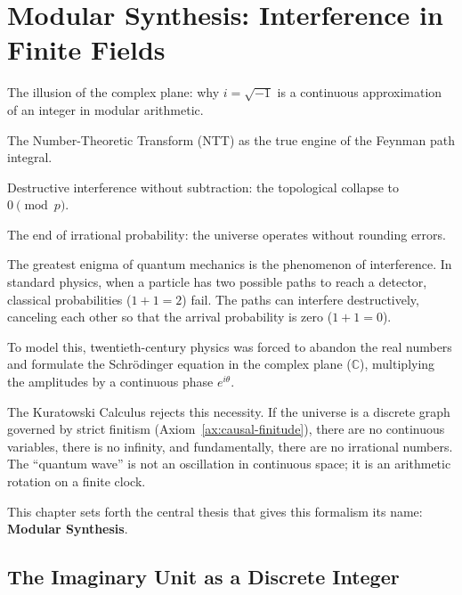 \chapter{Modular Synthesis: Interference in Finite Fields}
\label{ch:modulo-synthesis}

\begin{introduction}
  \item The illusion of the complex plane: why $i = \sqrt{-1}$ is a
        continuous approximation of an integer in modular arithmetic.
  \item The Number-Theoretic Transform (NTT) as the true engine of the
        Feynman path integral.
  \item Destructive interference without subtraction: the topological collapse to $0 \pmod p$.
  \item The end of irrational probability: the universe operates without rounding errors.
\end{introduction}

The greatest enigma of quantum mechanics is the phenomenon of
interference. In standard physics, when a particle has two possible
paths to reach a detector, classical probabilities ($1 + 1 = 2$) fail.
The paths can interfere destructively, canceling each other so that the
arrival probability is zero ($1 + 1 = 0$).

To model this, twentieth-century physics was forced to abandon the real
numbers and formulate the Schr\"odinger equation in the complex plane
($\mathbb{C}$), multiplying the amplitudes by a continuous phase
$e^{i\theta}$.

The Kuratowski Calculus rejects this necessity. If the universe is a
discrete graph governed by strict finitism
(Axiom~\ref{ax:causal-finitude}), there are no continuous variables,
there is no infinity, and fundamentally, there are no irrational numbers.
The ``quantum wave'' is not an oscillation in continuous space; it is an
arithmetic rotation on a finite clock.

This chapter sets forth the central thesis that gives this formalism its
name: \textbf{Modular Synthesis}.

\section{The Imaginary Unit as a Discrete Integer}
\label{sec:modulo-imaginario}

